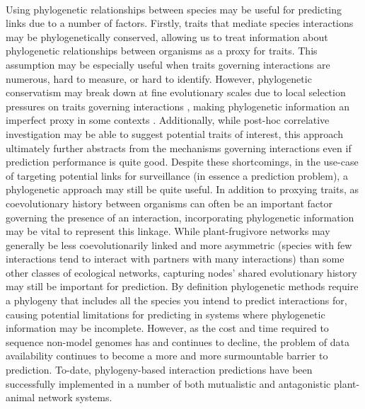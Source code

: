 \documentclass[num-refs]{article}%
\begin{document}
\paragraph*{}
Using phylogenetic relationships between species may be useful for predicting links due to a number of factors. Firstly, traits that mediate species interactions may be phylogenetically conserved, allowing us to treat information about phylogenetic relationships between organisms as a proxy for traits. This assumption may be especially useful when traits governing interactions are numerous, hard to measure, or hard to identify. However, phylogenetic conservatism may break down at fine evolutionary scales due to local selection pressures on traits governing interactions \citep{perez2007phylogenetic}, making phylogenetic information an imperfect proxy in some contexts \citep{rafferty2013}. Additionally, while post-hoc correlative investigation may be able to suggest potential traits of interest, this approach ultimately further abstracts from the mechanisms governing interactions even if prediction performance is quite good. Despite these shortcomings, in the use-case of targeting potential links for surveillance (in essence a prediction problem), a phylogenetic approach may still be quite useful. In addition to proxying traits, as coevolutionary history between organisms can often be an important factor governing the presence of an interaction, incorporating phylogenetic information may be vital to represent this linkage. While plant-frugivore networks may generally be less coevolutionarily linked and more asymmetric (species with few interactions tend to interact with partners with many interactions) than some other classes of ecological networks\citep{wheelwright1982seed, jordano1987patterns, maglianesi2024phylogenetic}, capturing nodes' shared evolutionary history may still be important for prediction. By definition phylogenetic methods require a phylogeny that includes all the species you intend to predict interactions for, causing potential limitations for predicting in systems where phylogenetic information may be incomplete. However, as the cost and time required to sequence non-model genomes has and continues to decline, the problem of data availability continues to become a more and more surmountable barrier to prediction. To-date, phylogeny-based interaction predictions have been successfully implemented in a number of both mutualistic\citep{Braga21} and antagonistic\citep{pearse2013predicting} plant-animal network systems.
\end{document}
